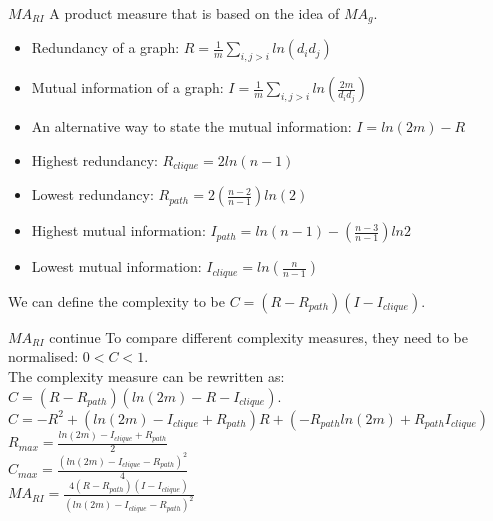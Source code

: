 \documentclass{beamer}
\begin{document}
    \begin{frame}{$MA_{RI}$}
        A product measure that is based on the idea of $MA_g$.
        \begin{itemize}
            \item Redundancy of a graph: $R=\frac{1}{m}\sum_{i,j>i}ln(d_id_j)$
            \item Mutual information of a graph: $I=\frac{1}{m}\sum_{i,j>i}ln(\frac{2m}{d_id_j})$
            \item An alternative way to state the mutual information: $I=ln(2m)-R$
            \item Highest redundancy: $R_{clique} = 2ln(n-1)$
            \item Lowest redundancy: $R_{path} = 2(\frac{n-2}{n-1})ln(2)$
            \item Highest mutual information: $I_{path} = ln(n-1)-(\frac{n-3}{n-1})ln2$
            \item Lowest mutual information: $I_{clique}=ln(\frac{n}{n-1})$
        \end{itemize}
        We can define the complexity to be $C = (R - R_{path})(I-I_{clique})$. 
    \end{frame}

    \begin{frame}{$MA_{RI}$ continue}
        To compare different complexity measures, they need to be normalised: $0<C<1$.\\
        The complexity measure can be rewritten as: $C=(R-R_{path})(ln(2m)-R-I_{clique})$.\\
        \vspace{5mm}
        \centering
        $C = -R^2+(ln(2m)-I_{clique}+R_{path})R+(-R_{path}ln(2m)+R_{path}I_{clique})$
    \\
        \vspace{5mm}
        $R_{max} = \frac{ln(2m)-I_{clique}+R_{path}}{2}$\\
        \vspace{5mm}
        $C_{max} = \frac{(ln(2m)-I_{clique}-R_{path})^2}{4}$\\
        \vspace{5mm}
        $MA_{RI} = \frac{4(R-R_{path})(I-I_{clique})}{(ln(2m)-I_{clique}-R_{path})^2}$
    \end{frame}
\end{document}
